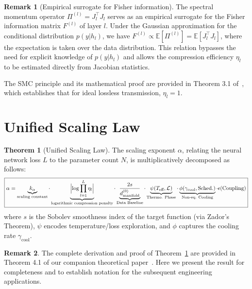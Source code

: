 \documentclass[11pt, a4paper]{article}
\theoremstyle{definition}
\newtheorem{theorem}{Theorem}[section]
\newtheorem{remark}{Remark}[section]
\begin{document}
\begin{remark}[Empirical surrogate for Fisher information]
The spectral momentum operator $\Pi^{(l)} = J_l^\top J_l$ serves as an empirical surrogate for the Fisher information matrix $F^{(l)}$ of layer $l$. Under the Gaussian approximation for the conditional distribution $p(y|h_l)$, we have $F^{(l)} \propto \mathbb{E}[\Pi^{(l)}] = \mathbb{E}[J_l^\top J_l]$, where the expectation is taken over the data distribution. This relation bypasses the need for explicit knowledge of $p(y|h_l)$ and allows the compression efficiency $\eta_l$ to be estimated directly from Jacobian statistics.
\end{remark}

The SMC principle and its mathematical proof are provided in Theorem 3.1 of~\cite{liu2024unified}, which establishes that for ideal lossless transmission, $\eta_l = 1$.

\section{Unified Scaling Law}
\label{sec:unified-scaling}

\begin{theorem}[Unified Scaling Law]
\label{thm:unified-scaling}
The scaling exponent $\alpha$, relating the neural network loss $L$ to the parameter count $N$, is multiplicatively decomposed as follows:
\begin{equation}
\boxed{
\alpha = \underbrace{k_\alpha}_{\text{scaling constant}} \cdot \underbrace{\Bigl|\log\prod_{l=1}^L \eta_l\Bigr|}_{\text{logarithmic compression penalty}} \cdot \underbrace{\frac{2s}{d_{\text{manifold}}^{(0)}}}_{\text{Data Baseline}} \cdot \underbrace{\psi(T_{\text{eff}}, \mathcal{L})}_{\text{Thermo. Phase}} \cdot \underbrace{\phi(\gamma_{\text{cool}}, \text{Sched.})}_{\text{Non-eq. Cooling}} \cdot \epsilon(\text{Coupling})
}
\end{equation}
where $s$ is the Sobolev smoothness index of the target function (via Zador's Theorem), $\psi$ encodes temperature/loss exploration, and $\phi$ captures the cooling rate $\gamma_{\text{cool}}$.
\end{theorem}

\begin{remark}
The complete derivation and proof of Theorem~\ref{thm:unified-scaling} are provided in Theorem 4.1 of our companion theoretical paper~\cite{liu2024unified}. Here we present the result for completeness and to establish notation for the subsequent engineering applications.
\end{remark}
\end{document}
